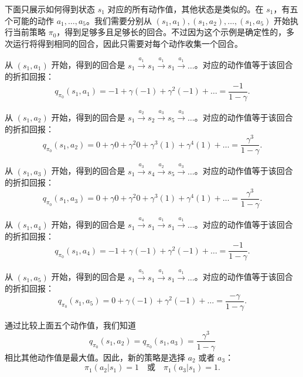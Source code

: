下面只展示如何得到状态 $s_1$ 对应的所有动作值，其他状态是类似的。在 $s_1$，有五个可能的动作 $a_1, \ldots, a_5$。我们需要分别从 $(s_1, a_1), (s_1, a_2), \ldots, (s_1, a_5)$ 开始执行当前策略 $\pi_0$，得到足够多且足够长的回合。不过因为这个示例是确定性的，多次运行将得到相同的回合，因此只需要对每个动作收集一个回合。

从 $(s_1, a_1)$ 开始，得到的回合是 $s_1 \xrightarrow{a_1} s_1 \xrightarrow{a_1} s_1 \xrightarrow{a_1} \ldots$。对应的动作值等于该回合的折扣回报：
\begin{equation}
q_{\pi_{0}}(s_{1}, a_{1}) = -1 + \gamma(-1) + \gamma^{2}(-1) + \dots = \frac{-1}{1 - \gamma}.
\end{equation}

从 $(s_1, a_2)$ 开始，得到的回合是 $s_1 \xrightarrow{a_2} s_2 \xrightarrow{a_3} s_5 \xrightarrow{a_3} \ldots$。对应的动作值等于该回合的折扣回报：
\begin{equation}
q_{\pi_{0}}(s_{1}, a_{2}) = 0 + \gamma 0 + \gamma^{2} 0 + \gamma^{3}(1) + \gamma^{4}(1) + \dots = \frac{\gamma^{3}}{1 - \gamma}.
\end{equation}

从 $(s_1, a_3)$ 开始，得到的回合是 $s_1 \xrightarrow{a_3} s_4 \xrightarrow{a_2} s_5 \xrightarrow{a_3} \ldots$。对应的动作值等于该回合的折扣回报：
\begin{equation}
q_{\pi_{0}}(s_{1}, a_{3}) = 0 + \gamma 0 + \gamma^{2} 0 + \gamma^{3}(1) + \gamma^{4}(1) + \dots = \frac{\gamma^{3}}{1 - \gamma}.
\end{equation}

从 $(s_1, a_4)$ 开始，得到的回合是 $s_1 \xrightarrow{a_4} s_1 \xrightarrow{a_1} s_1 \xrightarrow{a_1} \ldots$。对应的动作值等于该回合的折扣回报：
\begin{equation}
q_{\pi_{0}}(s_{1}, a_{4}) = -1 + \gamma(-1) + \gamma^{2}(-1) + \dots = \frac{-1}{1 - \gamma}.
\end{equation}

从 $(s_1, a_5)$ 开始，得到的回合是 $s_1 \xrightarrow{a_5} s_1 \xrightarrow{a_1} s_1 \xrightarrow{a_1} \ldots$。对应的动作值等于该回合的折扣回报：
\begin{equation}
q_{\pi_{0}}(s_{1}, a_{5}) = 0 + \gamma(-1) + \gamma^{2}(-1) + \dots = \frac{-\gamma}{1 - \gamma}.
\end{equation}

通过比较上面五个动作值，我们知道
\begin{equation}
q_{\pi_{0}}(s_{1}, a_{2}) = q_{\pi_{0}}(s_{1}, a_{3}) = \frac{\gamma^{3}}{1 - \gamma}
\end{equation}
相比其他动作值是最大值。因此，新的策略是选择 $a_2$ 或者 $a_3$：
\begin{equation}
\pi_{1}(a_{2}|s_{1}) = 1 \quad \text{或} \quad \pi_{1}(a_{3}|s_{1}) = 1.
\end{equation}

